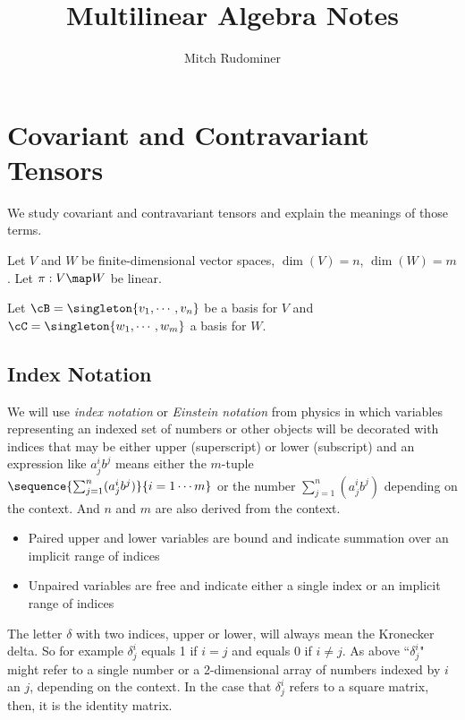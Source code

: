 \documentclass[oneside,12pt]{amsart}
\begin{document}
\title{Multilinear Algebra Notes}
\author{Mitch Rudominer}

\maketitle

\tableofcontents


\section{Covariant and Contravariant Tensors}

We study covariant and contravariant tensors and explain the meanings of those terms.

Let $V$ and $W$ be finite-dimensional vector spaces, 
$\dim(V)=n$, $\dim(W) = m$. Let $\pi:V\map W$ be linear.

Let $\cB = \singleton{v_1,\cdots,v_n}$ be a basis for $V$ and
$\cC=\singleton{w_1,\cdots,w_m}$ a basis for $W$.

\subsection{Index Notation}
We will use \emph{index notation} or \emph{Einstein notation}
from physics in which variables representing an indexed set of numbers or other objects will
be decorated with indices that may be either upper (superscript) or lower (subscript) and
an expression
like $a^i_j b^j$ means either the $m$-tuple 
$\sequence{\sum_{j=1}^n(a^i_j b^j)}{i=1\cdots m}$
or the number $\sum_{j=1}^n(a^i_j b^j)$ depending on the context. 
And $n$ and $m$ are also derived from the context.

\begin{itemize}
\item Paired upper and lower variables are bound and indicate summation over an implicit range of indices
\item Unpaired variables are free and indicate either a single index or an implicit range of indices
\end{itemize}

The letter $\delta$ with two indices, upper or lower, will always mean the Kronecker delta. So for example $\delta^i_j$ equals 1 if $i=j$ and equals 0 if $i\neq j$. 
As above ``$\delta^i_j$" might refer to a single number or a 2-dimensional array
of numbers indexed by $i$ an $j$, depending on the context. In the case that
$\delta^i_j$ refers to a square matrix, then, it is the identity matrix.
\end{document}
